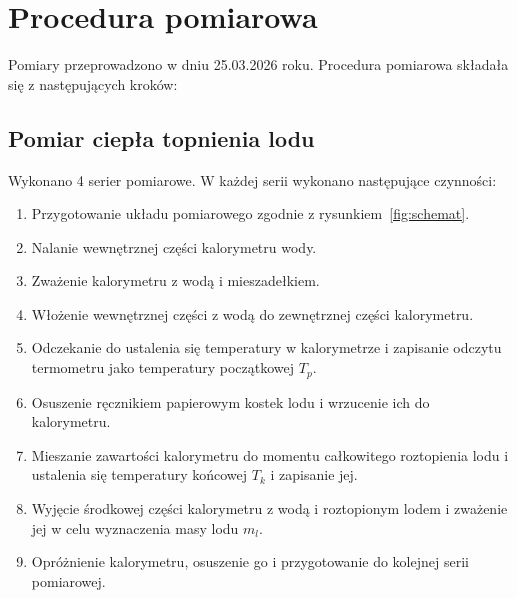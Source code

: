 \documentclass[12pt, a4paper]{article}
\begin{document}
\section{Procedura pomiarowa}
Pomiary przeprowadzono w dniu 25.03.2026 roku. Procedura pomiarowa składała się z następujących kroków:

\subsection{Pomiar ciepła topnienia lodu}
Wykonano 4 serier pomiarowe. W każdej serii wykonano następujące czynności:
\begin{enumerate}
    \item Przygotowanie układu pomiarowego zgodnie z rysunkiem~\ref{fig:schemat}.
    \item Nalanie wewnętrznej części kalorymetru wody.
    \item Zważenie kalorymetru z wodą i mieszadełkiem.
    \item Włożenie wewnętrznej części z wodą do zewnętrznej części kalorymetru.
    \item Odczekanie do ustalenia się temperatury w kalorymetrze i zapisanie odczytu termometru jako temperatury początkowej $T_p$.
    \item Osuszenie ręcznikiem papierowym kostek lodu i wrzucenie ich do kalorymetru.
    \item Mieszanie zawartości kalorymetru do momentu całkowitego roztopienia lodu i ustalenia się temperatury końcowej $T_k$ i zapisanie jej.
    \item Wyjęcie środkowej części kalorymetru z wodą i roztopionym lodem i zważenie jej w celu wyznaczenia masy lodu $m_l$.
    \item Opróżnienie kalorymetru, osuszenie go i przygotowanie do kolejnej serii pomiarowej.
\end{enumerate}
\end{document}
